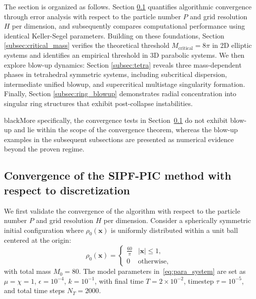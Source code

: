 \documentclass[review,onefignum,onetabnum]{siamart250211}
\begin{document}
The section is organized as follows. Section \ref{subsec:rad} quantifies algorithmic convergence through error analysis with respect to the particle number \( P \) and grid resolution \( H \) per dimension, and subsequently compares computational performance using identical Keller-Segel parameters. Building on these foundations, Section \ref{subsec:critical_mass} verifies the theoretical threshold \( M_{\text{critical}} = 8\pi \) in 2D elliptic systems and identifies an empirical threshold in 3D parabolic systems. We then explore blow-up dynamics: Section \ref{subsec:tetra} reveals three mass-dependent phases in tetrahedral symmetric systems, including subcritical dispersion, intermediate unified blowup, and supercritical multistage singularity formation. Finally, Section \ref{subsec:ring_blowup} demonstrates radial concentration into singular ring structures that exhibit post-collapse instabilities. \begin{color}{black}More specifically, the convergence tests in Section~\ref{subsec:rad} do not exhibit blow-up and lie within the scope of the convergence theorem, whereas the blow-up examples in the subsequent subsections are presented as numerical evidence beyond the proven regime.
\end{color}


\subsection{Convergence of the SIPF-PIC method with respect to discretization}\label{subsec:rad}
We first validate the convergence of the algorithm with respect to the particle number $P$ and grid resolution $H$ per dimension. Consider a spherically symmetric initial configuration where $\rho_0(\mathbf{x})$ is uniformly distributed within a unit ball centered at the origin:  
\begin{equation}
\label{radius}
\rho_0(\mathbf{x}) = \begin{cases} 
\frac{60}{\pi} & |\mathbf{x}| \leq 1, \\
0 & \text{otherwise},
\end{cases}
\end{equation}
with total mass $M_0 = 80$. The model parameters in~\eqref{eq:para_system} are set as $\mu = \chi = 1$, $\epsilon = 10^{-4}$, $k = 10^{-1}$, with final time $T = 2 \times 10^{-2}$, timestep $\tau = 10^{-5}$, and total time steps $N_T=2000$.  
\end{document}
